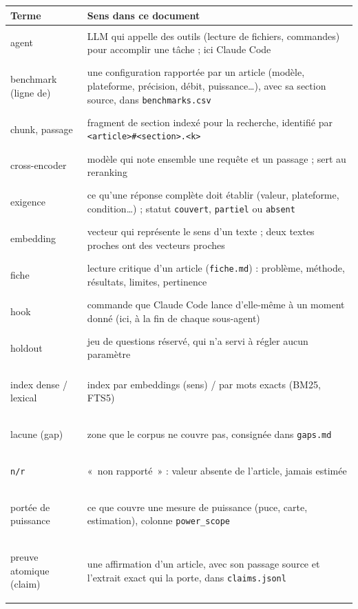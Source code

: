 \documentclass[11pt,a4paper]{article}
\newcommand{\cmd}[1]{\texttt{#1}}
\begin{document}
\begin{center}
\small
\begin{tabularx}{\linewidth}{@{}lL@{}}
\toprule
Terme & Sens dans ce document \\
\midrule
\hypertarget{gl:agent}{agent} & LLM qui appelle des outils (lecture de fichiers, commandes) pour accomplir une tâche ; ici Claude Code \\
\hypertarget{gl:benchmark}{benchmark (ligne de)} & une configuration rapportée par un article (modèle, plateforme, précision, débit, puissance\ldots), avec sa section source, dans \cmd{benchmarks.csv} \\
\hypertarget{gl:passage}{chunk, passage} & fragment de section indexé pour la recherche, identifié par \cmd{<article>\#<section>.<k>} \\
\hypertarget{gl:crossenc}{cross-encoder} & modèle qui note ensemble une requête et un passage ; sert au reranking \\
\hypertarget{gl:exigence}{exigence} & ce qu'une réponse complète doit établir (valeur, plateforme, condition\ldots) ; statut \cmd{couvert}, \cmd{partiel} ou \cmd{absent} \\
\hypertarget{gl:embedding}{embedding} & vecteur qui représente le sens d'un texte ; deux textes proches ont des vecteurs proches \\
\hypertarget{gl:fiche}{fiche} & lecture critique d'un article (\cmd{fiche.md}) : problème, méthode, résultats, limites, pertinence \\
\hypertarget{gl:hook}{hook} & commande que Claude Code lance d'elle-même à un moment donné (ici, à la fin de chaque sous-agent) \\
\hypertarget{gl:holdout}{holdout} & jeu de questions réservé, qui n'a servi à régler aucun paramètre \\
\hypertarget{gl:index}{index dense / lexical} & index par embeddings (sens) / par mots exacts (BM25, FTS5) \\
\hypertarget{gl:gap}{lacune (gap)} & zone que le corpus ne couvre pas, consignée dans \cmd{gaps.md} \\
\hypertarget{gl:nr}{\texttt{n/r}} & «~non rapporté~» : valeur absente de l'article, jamais estimée \\
\hypertarget{gl:scope}{portée de puissance} & ce que couvre une mesure de puissance (puce, carte, estimation), colonne \cmd{power\_scope} \\
\hypertarget{gl:claim}{preuve atomique (claim)} & une affirmation d'un article, avec son passage source et l'extrait exact qui la porte, dans \cmd{claims.jsonl} \\

\end{tabularx}
\end{center}
\end{document}
